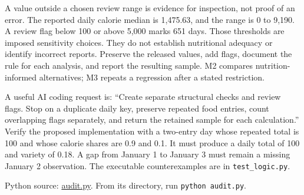 A value outside a chosen review range is evidence for inspection, not
proof of an error. The reported daily calorie median is 1,475.63, and
the range is 0 to 9,190. A review flag below 100 or above 5,000 marks
651 days. Those thresholds are imposed sensitivity choices. They do not
establish nutritional adequacy or identify incorrect reports. Preserve
the released values, add flags, document the rule for each analysis, and
report the resulting sample. M2 compares nutrition-informed
alternatives; M3 repeats a regression after a stated restriction.

A useful AI coding request is: ``Create separate structural checks and
review flags. Stop on a duplicate daily key, preserve repeated food
entries, count overlapping flags separately, and return the retained
sample for each calculation.'' Verify the proposed implementation with a
two-entry day whose repeated total is 100 and whose calorie shares are
0.9 and 0.1. It must produce a daily total of 100 and variety of 0.18. A
gap from January 1 to January 3 must remain a missing January 2
observation. The executable counterexamples are in
\texttt{test\_logic.py}.

\FloatBarrier
{}
Python source:
\href{../03_Data_and_Code/mHealth/recurring_examples/audit.py}{audit.py}.
From its directory, run \texttt{python\ audit.py}.

